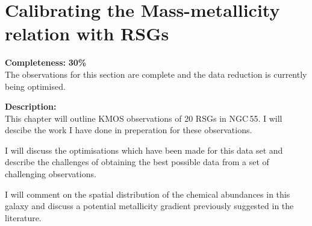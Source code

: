 \chapter{Calibrating the Mass-metallicity relation with RSGs}

\textbf{Completeness:} \textbf{30\%} \\
The observations for this section are complete and the data reduction is
currently being optimised.

\textbf{Description:} \\
This chapter will outline KMOS observations of 20 RSGs in NGC\,55.
I will descibe the work I have done in preperation for these observations.

I will discuss the optimisations which have been made for this data set and
describe the challenges of obtaining the best possible data from a set of
challenging observations.

I will comment on the spatial distribution of the chemical abundances in this
galaxy and discuss a potential metallicity gradient previously suggested in
the literature.
